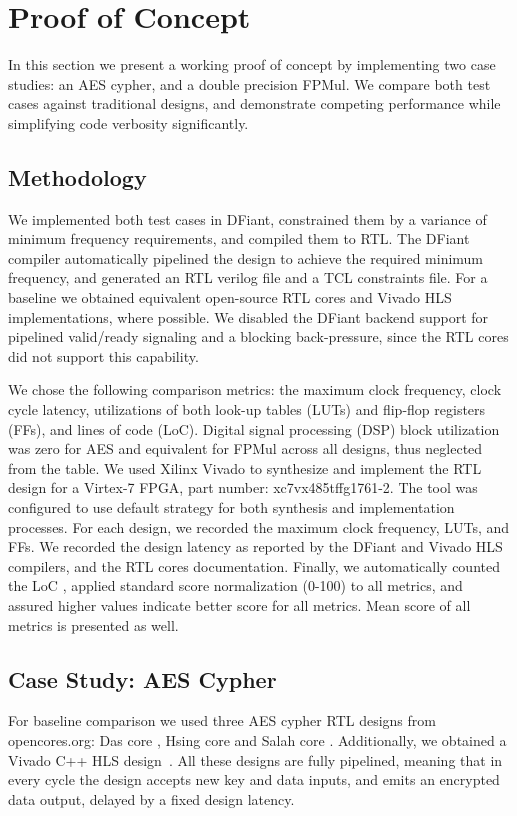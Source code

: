 \section{Proof of Concept}
\label{sec:evaluation}
In this section we present a working proof of concept by implementing two case studies: an AES cypher, and a double precision FPMul. We compare both test cases against traditional designs, and demonstrate competing performance while simplifying code verbosity significantly. 

\subsection{Methodology}
We implemented both test cases in DFiant, constrained them by a variance of minimum frequency requirements, and compiled them to RTL. The DFiant compiler automatically pipelined the design to achieve the required minimum frequency, and generated an RTL verilog file and a TCL constraints file. For a baseline we obtained equivalent open-source RTL cores and Vivado HLS implementations, where possible. We disabled the DFiant backend support for pipelined valid/ready signaling and a blocking back-pressure, since the RTL cores did not support this capability.

We chose the following comparison metrics: the maximum clock frequency, clock cycle latency, utilizations of both look-up tables (LUTs) and flip-flop registers (FFs), and lines of code (LoC). Digital signal processing (DSP) block utilization was zero for AES and equivalent for FPMul across all designs, thus neglected from the table. We used Xilinx Vivado to synthesize and implement the RTL design for a Virtex-7 FPGA, part number: xc7vx485tffg1761-2. The tool was configured to use default strategy for both synthesis and implementation processes. For each design, we recorded the maximum clock frequency, LUTs, and FFs. We recorded the design latency as reported by the DFiant and Vivado HLS compilers, and the RTL cores documentation. Finally, we automatically counted the LoC \cite{danial2009cloc}, applied standard score normalization (0-100) to all metrics, and assured higher values indicate better score for all metrics. Mean score of all metrics is presented as well.

\subsection{Case Study: AES Cypher}
For baseline comparison we used three AES cypher RTL designs from opencores.org: Das core \cite{das2010fully}, Hsing core \cite{hsing2013aes} and Salah core \cite{salah2013aespipe}. Additionally, we obtained a Vivado C++ HLS design~\cite{oflynn2014rapid}. All these designs are fully pipelined, meaning that in every cycle the design accepts new key and data inputs, and emits an encrypted data output, delayed by a fixed design latency.

